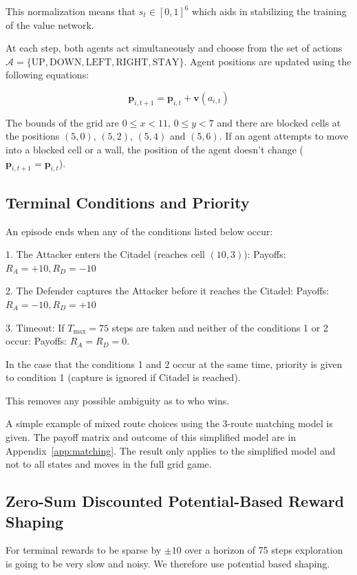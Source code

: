 \documentclass[conference]{IEEEtran}
\begin{document}
This normalization means that $s_t \in [0, 1]^6$ which aids in stabilizing the training of the value network.

At each step, both agents act simultaneously and choose from the set of actions $\mathcal{A} = \{\text{UP}, \text{DOWN}, \text{LEFT}, \text{RIGHT}, \text{STAY}\}$. Agent positions are updated using the following equations:

\begin{equation}
\bm{p}_{i, t+1} = \bm{p}_{i, t} + \bm{v}(a_{i, t})
\end{equation}

The bounds of the grid are $0 \leq x < 11$, $0 \leq y < 7$ and there are blocked cells at the positions $(5, 0)$, $(5, 2)$, $(5, 4)$ and $(5, 6)$. If an agent attempts to move into a blocked cell or a wall, the position of the agent doesn't change ($ \bm{p}_{i, t+1} = \bm{p}_{i, t} $).

\subsection{Terminal Conditions and Priority}

An episode ends when any of the conditions listed below occur:

1. The Attacker enters the Citadel (reaches cell $(10, 3)$): Payoffs: $R_A = +10, R_D = -10$

2. The Defender captures the Attacker before it reaches the Citadel: Payoffs: $R_A = -10, R_D = +10$

3. Timeout: If $T_{\max} = 75$ steps are taken and neither of the conditions 1 or 2 occur: Payoffs: $R_A = R_D = 0$.

In the case that the conditions 1 and 2 occur at the same time, priority is given to condition 1 (capture is ignored if Citadel is reached).

This removes any possible ambiguity as to who wins.

A simple example of mixed route choices using the 3-route matching model is given. The payoff matrix and outcome of this simplified model are in Appendix~\ref{app:matching}. The result only applies to the simplified model and not to all states and moves in the full grid game.

\subsection{Zero-Sum Discounted Potential-Based Reward Shaping}

For terminal rewards to be sparse by $\pm 10$ over a horizon of 75 steps exploration is going to be very slow and noisy. We therefore use potential based shaping.
\end{document}

